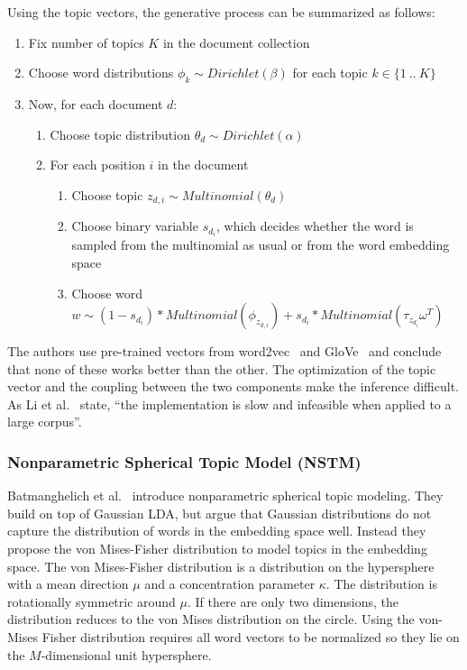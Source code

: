 \documentclass[
        a4paper,
        titlepage,
        twoside,
        parskip,
        numbers=noenddot
        ]{scrbook}
\theoremstyle{break}
\begin{document}
Using the topic vectors, the generative process can be summarized as follows:
\begin{enumerate}
    \item Fix number of topics $K$ in the document collection
    \item Choose word distributions $\phi_k \sim Dirichlet(\beta)$ for each topic $k \in \{1~..~K\}$
    \item Now, for each document $d$:
    \begin{enumerate}
        \item Choose topic distribution $\theta_d \sim Dirichlet(\alpha)$
        \item For each position $i$ in the document
        \begin{enumerate}
            \item Choose topic $z_{d,i} \sim Multinomial(\theta_d)$
            \item Choose binary variable $s_{d_i}$, which decides whether the word is sampled from the multinomial as usual or from the word embedding space
            \item Choose word $w \sim (1 - s_{d_i}) * Multinomial(\phi_{z_{d,i}}) + s_{d_i} * Multinomial(\tau_{z_{d_{i}}} \omega^T)$
        \end{enumerate}
    \end{enumerate}
\end{enumerate}
The authors use pre-trained vectors from word2vec~\cite{Mikolov2013a} and GloVe~\cite{Pennington2014} and conclude that none of these works better than the other.
The optimization of the topic vector and the coupling between the two components make the inference difficult.
As Li et al.~\cite{Li2016} state, ``the implementation is slow and infeasible when applied to a large corpus''.

\subsubsection{Nonparametric Spherical Topic Model (NSTM)}
Batmanghelich et al.~\cite{Batmanghelich2016} introduce nonparametric spherical topic modeling.
They build on top of Gaussian LDA, but argue that Gaussian distributions do not capture the distribution of words in the embedding space well.
Instead they propose the von Mises-Fisher distribution to model topics in the embedding space.
The von Mises-Fisher distribution is a distribution on the hypersphere with a mean direction $\mu$ and a concentration parameter $\kappa$.
The distribution is rotationally symmetric around $\mu$.
If there are only two dimensions, the distribution reduces to the von Mises distribution on the circle.
Using the von-Mises Fisher distribution requires all word vectors to be normalized so they lie on the $M$-dimensional unit hypersphere.
\end{document}

